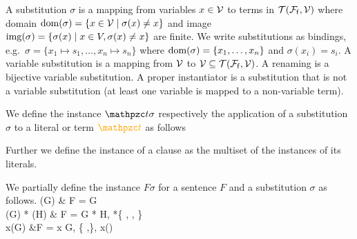 


\begin{definition}\label{def:substitution}
	A {\myem substitution} $\sigma$ is a mapping from variables $x\in\mathcal{V}$ to terms in ${\mathcal{T}(\mathcal{F}_{\mathsf{f}},\mathcal{V})}$
	where {\myem domain }$\operatorname{dom}(\sigma) = \{ x\in\mathcal{V}\mid\sigma(x) \neq x \}$
	and image $\operatorname{img}(\sigma) =\{ \sigma(x) \mid x\in V, \sigma(x)\neq x \}$ are finite.
	We write substitutions as bindings, e.g.~$\sigma=\{ x_1\mapsto s_1,\ldots,x_n\mapsto s_n \}$
	where $\operatorname{dom}(\sigma)=\{ x_1,\ldots,x_n \}$ and $\sigma(x_i)=s_i$.
	A {\myem variable substitution} is a mapping from $\mathcal{V}$ to $\mathcal{V}\subseteq{\mathcal{T}(\mathcal{F}_{\mathsf{f}},\mathcal{V})}$.
	A {\myem renaming} is a bijective variable substitution.
	A {\myem proper instantiator} is a substitution that is not a variable substitution
	(at least one variable is mapped to a non-variable term).
\end{definition}
\begin{definition}
	We define the instance $\mct\sigma$
	respectively the application of a substitution $\sigma$ to a literal or term $\foxt$ as follows

\noindent Further we define the instance of a clause as the multiset of the instances of its literals.
\end{definition}

\begin{definition}
	We partially define the instance $F\sigma$ for a sentence $F$ and a substitution $\sigma$ as follows.
{
		\lnot(G\sigma) & F = \lnot G\\
		(G\sigma) * (H\sigma) & F = G * H, *\in \{ \land, \lor, \limp \}\\
		\quantify x(G\sigma) &F = \quantify x G,
		\quantify\in\{ \forall,\exists \},
		x\not\in\domain(\sigma)
	}
\end{definition}

